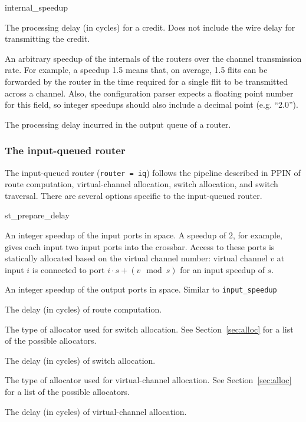 \documentclass[11pt]{article}
\begin{document}
\begin{opt_list}{internal\_speedup}
\item[credit\_delay] The processing delay (in cycles) for a credit.
Does not include the wire delay for transmitting the credit.

\item[internal\_speedup] An arbitrary speedup of the internals of the
routers over the channel transmission rate.  For example, a speedup
1.5 means that, on average, 1.5 flits can be forwarded by the router
in the time required for a single flit to be transmitted across a
channel.  Also, the configuration parser expects a floating point
number for this field, so integer speedups should also include a
decimal point (e.g. ``2.0'').

\item[output\_delay] The processing delay incurred in the output queue
of a router.
\end{opt_list}

\subsubsection{The input-queued router}
\label{sec:iq_router}

The input-queued router (\texttt{router = iq}) follows the pipeline
described in PPIN of route computation, virtual-channel allocation,
switch allocation, and switch traversal.  There are several options
specific to the input-queued router.

\begin{opt_list}{st\_prepare\_delay}

\item[input\_speedup] An integer speedup of the input ports in space.
A speedup of 2, for example, gives each input two input ports into the
crossbar.  Access to these ports is statically allocated based on the
virtual channel number: virtual channel $v$ at input $i$ is connected
to port $i \cdot s + (v \mod s)$ for an input speedup of $s$.

\item[output\_speedup] An integer speedup of the output ports in
space.  Similar to \texttt{input\_speedup}

\item[routing\_delay] The delay (in cycles) of route computation.

\item[sw\_allocator] The type of allocator used for switch allocation.
See Section~\ref{sec:alloc} for a list of the possible allocators.

\item[sw\_alloc\_delay] The delay (in cycles) of switch allocation.

\item[vc\_allocator] The type of allocator used for virtual-channel
allocation.  See Section~\ref{sec:alloc} for a list of the possible
allocators.

\item[vc\_alloc\_delay] The delay (in cycles) of virtual-channel
allocation.

\end{opt_list}
\end{document}
